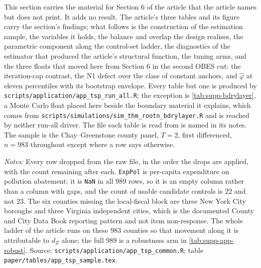 \documentclass[
  12pt]{article}
\newcommand{\1}[1]{\mathds{1}\left[#1\right]}
\theoremstyle{plain}
\theoremstyle{definition}
\theoremstyle{definition}
\theoremstyle{remark}
\begin{document}
This section carries the material for Section 6 of the article that the article
names but does not print. It adds no result. The article's three tables and its
figure carry the
section's findings; what follows is the construction of the estimation sample,
the variables it holds, the balance and overlap the design realises, the
parametric component along the control-set ladder, the diagnostics of the
estimator that produced the article's structural function, the tuning arms, and
the three floats that moved here from Section 6 in the second OBES cut: the
iteration-cap contrast, the N1 defect over the class of constant anchors, and
$\hat\varphi$ at eleven percentiles with its bootstrap envelope.
Every table but one is produced by
\texttt{scripts/application/app\_tsp\_run\_all.R}; the exception is
\cref{tab:supp-bdrylayer}, a Monte Carlo float placed here beside the boundary
material it explains, which comes from
\texttt{scripts/simulations/sim\_thm\_rootn\_bdrylayer.R} and is reached by
neither run-all driver. The file each table is read from is
named in its notes. The sample is the Chay--Greenstone county panel,
$T=2$, first differenced, $n=983$ throughout except where a row says otherwise.

\begin{table}[!htbp]
\centering
\begin{threeparttable}
\caption{Construction of the estimation sample}
\label{tab:supp-app-sample}
\footnotesize

\begin{tablenotes}\footnotesize
\item \textit{Notes:} Every row dropped from the raw file, in the order the
drops are applied, with the count remaining after each. \texttt{ExpPol} is
per-capita expenditure on pollution abatement; it is \texttt{NaN} in all $989$
rows, so it is an empty column rather than a column with gaps, and the count of
usable candidate controls is $22$ and not $23$. The six counties missing the
local-fiscal block are three New York City boroughs and three Virginia
independent cities, which is the documented County and City Data Book reporting
pattern and not item non-response. The whole ladder of the article runs on these
$983$ counties so that movement along it is attributable to $d_Z$ alone; the
full $989$ is a robustness arm in \cref{tab:supp-app-robust}. Source:
\texttt{scripts/application/app\_tsp\_common.R}; table
\texttt{paper/tables/app\_tsp\_sample.tex}.
\end{tablenotes}
\end{threeparttable}
\end{table}
\end{document}
